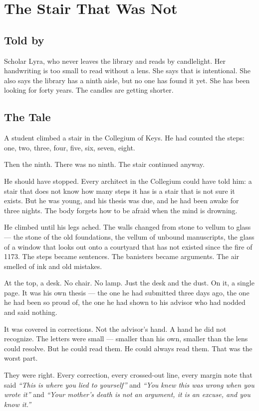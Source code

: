 \chapter{The Stair That Was Not}

\section*{Told by}
Scholar Lyra, who never leaves the library and reads by candlelight. Her handwriting is too small to read without a lens. She says that is intentional. She also says the library has a ninth aisle, but no one has found it yet. She has been looking for forty years. The candles are getting shorter.

\section*{The Tale}

A student climbed a stair in the Collegium of Keys. He had counted the steps: one, two, three, four, five, six, seven, eight.

Then the ninth. There was no ninth. The stair continued anyway.

He should have stopped. Every architect in the Collegium could have told him: a stair that does not know how many steps it has is a stair that is not sure it exists. But he was young, and his thesis was due, and he had been awake for three nights. The body forgets how to be afraid when the mind is drowning.

He climbed until his legs ached. The walls changed from stone to vellum to glass --- the stone of the old foundations, the vellum of unbound manuscripts, the glass of a window that looks out onto a courtyard that has not existed since the fire of 1173. The steps became sentences. The banisters became arguments. The air smelled of ink and old mistakes.

At the top, a desk. No chair. No lamp. Just the desk and the dust. On it, a single page. It was his own thesis --- the one he had submitted three days ago, the one he had been so proud of, the one he had shown to his advisor who had nodded and said nothing.

It was covered in corrections. Not the advisor's hand. A hand he did not recognize. The letters were small --- smaller than his own, smaller than the lens could resolve. But he could read them. He could always read them. That was the worst part.

They were right. Every correction, every crossed-out line, every margin note that said \textit{``This is where you lied to yourself''} and \textit{``You knew this was wrong when you wrote it''} and \textit{``Your mother's death is not an argument, it is an excuse, and you know it.''}

